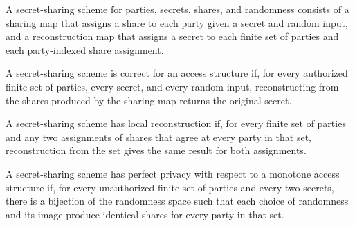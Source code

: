 \begin{definition}
\label{TCSlib.SecretSharing.Scheme}
\leanok
A secret-sharing scheme for parties, secrets, shares, and randomness consists of a
sharing map that assigns a share to each party given a secret and random input, and a
reconstruction map that assigns a secret to each finite set of parties and each
party-indexed share assignment.
\end{definition}

\begin{definition}
\label{TCSlib.SecretSharing.Scheme.Correct}
\leanok
{}
A secret-sharing scheme is correct for an access structure if, for every authorized
finite set of parties, every secret, and every random input, reconstructing from the
shares produced by the sharing map returns the original secret.
\end{definition}

\begin{definition}
\label{TCSlib.SecretSharing.Scheme.LocalReconstruct}
\leanok
A secret-sharing scheme has local reconstruction if, for every finite set of parties and
any two assignments of shares that agree at every party in that set, reconstruction from
the set gives the same result for both assignments.
\end{definition}

\begin{definition}
\label{TCSlib.SecretSharing.Scheme.PerfectPrivacy}
\leanok
{}
A secret-sharing scheme has perfect privacy with respect to a monotone access structure
if, for every unauthorized finite set of parties and every two secrets, there is a
bijection of the randomness space such that each choice of randomness and its image
produce identical shares for every party in that set.
\end{definition}


